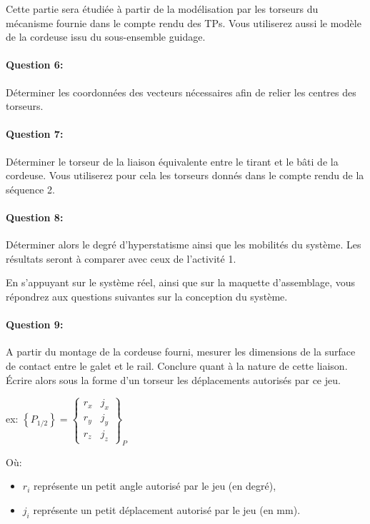\cleardoublepage


Cette partie sera étudiée à partir de la modélisation par les torseurs du mécanisme fournie dans le compte rendu des TPs. Vous utiliserez aussi le modèle de la cordeuse issu du sous-ensemble guidage.

\paragraph{Question 6:} Déterminer les coordonnées des vecteurs nécessaires afin de relier les centres des torseurs.

\paragraph{Question 7:} Déterminer le torseur de la liaison équivalente entre le tirant et le bâti de la cordeuse. Vous utiliserez pour cela les torseurs donnés dans le compte rendu de la séquence 2.

\paragraph{Question 8:} Déterminer alors le degré d'hyperstatisme ainsi que les mobilités du système. Les résultats seront à comparer avec ceux de l'activité 1.

\cleardoublepage


En s'appuyant sur le système réel, ainsi que sur la maquette d'assemblage, vous répondrez aux questions suivantes sur la conception du système.

\paragraph{Question 9:} A partir du montage de la cordeuse fourni, mesurer les dimensions de la surface de contact entre le galet et le rail. Conclure quant à la nature de cette liaison. Écrire alors sous la forme d'un torseur les déplacements autorisés par ce jeu.

ex:
$\left\{P_{1/2}\right\}=\left\{ \begin{array}{cc} r_x & j_x \\ r_y & j_y \\ r_z & j_z \end{array}\right\}_{P}$

Où:
\begin{itemize}
 \item $r_i$ représente un petit angle autorisé par le jeu (en degré),
 \item $j_i$ représente un petit déplacement autorisé par le jeu (en mm). 
\end{itemize}

